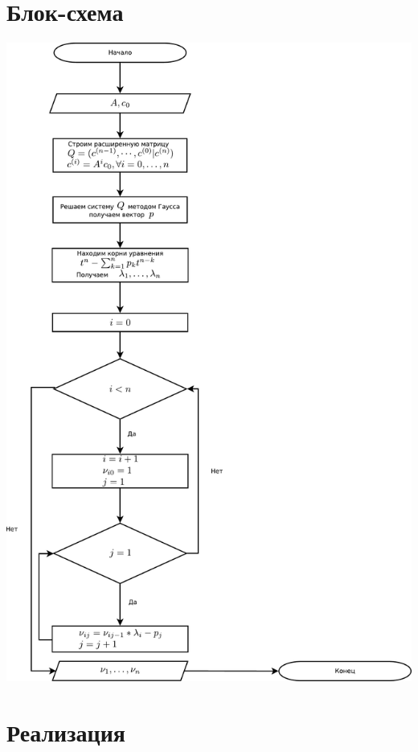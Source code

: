 \documentclass[a4paper,11pt]{article}
\begin{document}
\part*{Блок-схема} 
 \includegraphics[scale=0.55]{flowchart.pdf} 


\newpage
\part*{Реализация}



\newpage
\end{document}
